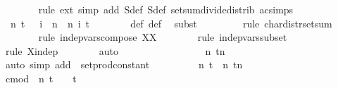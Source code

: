 \documentclass{svjour3}
\begin{document}
{\begin{isabellebody}
\ \ \ \ \ \ \isamarkupfalse%
\ {\isacharparenleft}rule\ ext{\isacharcomma}\ simp\ add{\isacharcolon}\ S{\isacharprime}{\isacharunderscore}def\ S{\isacharunderscore}def\ setsum{\isacharunderscore}divide{\isacharunderscore}distrib\ ac{\isacharunderscore}simps{\isacharparenright}\isanewline
\isanewline
\ \ \ \ \isamarkupfalse%
\ {\isachardoublequoteopen}{\isasymphi}\ n\ t\ {\isacharequal}\ {\isacharparenleft}{\isasymProd}\ i\ {\isacharless}\ n{\isachardot}\ {\isasympsi}{\isacharprime}\ n\ i\ t{\isacharparenright}{\isachardoublequoteclose}\isanewline
\ \ \ \ \ \ \isamarkupfalse%
\ {\isasymphi}{\isacharunderscore}def\ {\isasympsi}{\isacharprime}{\isacharunderscore}def\ \isamarkupfalse%
\ {\isacharparenleft}subst\ {}{\isacharparenright}\isanewline
\ \ \ \ \ \ \isamarkupfalse%
\ {\isacharparenleft}rule\ char{\isacharunderscore}distr{\isacharunderscore}setsum{\isacharparenright}\isanewline
\ \ \ \ \ \ \isamarkupfalse%
\ {\isacharparenleft}rule\ indep{\isacharunderscore}vars{\isacharunderscore}compose{}{\isacharbrackleft}\ X{\isacharequal}X{\isacharbrackright}{\isacharparenright}\isanewline
\ \ \ \ \ \ \isamarkupfalse%
\ {\isacharparenleft}rule\ indep{\isacharunderscore}vars{\isacharunderscore}subset{\isacharparenright}\isanewline
\ \ \ \ \ \ \isamarkupfalse%
\ {\isacharparenleft}rule\ X{\isacharunderscore}indep{\isacharparenright}\isanewline
\ \ \ \ \ \ \isamarkupfalse%
\ auto\isanewline
\ \ \ \ \ \ \isamarkupfalse%
\isanewline
\ \ \ \ \isamarkupfalse%
\ \isamarkupfalse%
\ {\isachardoublequoteopen}{\isasymdots}\ {\isacharequal}\ {\isacharparenleft}{\isasympsi}\ n\ t{\isacharparenright}{\isacharcircum}n{\isachardoublequoteclose}\isanewline
\ \ \ \ \ \ \isamarkupfalse%
\ {\isacharparenleft}auto\ simp\ add{\isacharcolon}\ {\isacharasterisk}\ setprod{\isacharunderscore}constant{\isacharparenright}\isanewline
\ \ \ \ \isamarkupfalse%
\ \isamarkupfalse%
\ {}{\isacharcolon}\ {\isachardoublequoteopen}{\isasymphi}\ n\ t\ {\isacharequal}{\isacharparenleft}{\isasympsi}\ n\ t{\isacharparenright}{\isacharcircum}n{\isachardoublequoteclose}\ \isacommand{{\isachardot}}\isamarkupfalse%
\isanewline
\isanewline
\ \ \ \ \isamarkupfalse%
\ {\isachardoublequoteopen}cmod\ {\isacharparenleft}{\isasympsi}\ n\ t\ {\isacharminus}\ {\isacharparenleft}{}\ {\isacharminus}\ {\isacharquery}t{\isacharcircum}{}\ {\isacharasterisk}\ {\isasymsigma}\ {\isacharslash}\ {}{\isacharparenright}{\isacharparenright}\ {\isasymle}\ \isanewline

\end{isabellebody}}
\end{document}
